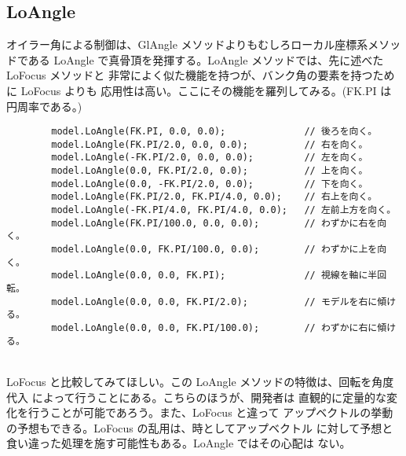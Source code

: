 \subsection{LoAngle}
オイラー角による制御は、GlAngle メソッドよりもむしろローカル座標系メソッドである
LoAngle で真骨頂を発揮する。LoAngle メソッドでは、先に述べた LoFocus メソッドと
非常によく似た機能を持つが、バンク角の要素を持つために LoFocus よりも
応用性は高い。ここにその機能を羅列してみる。(FK.PI は円周率である。)
\\
\begin{breakbox}
\begin{verbatim}
        model.LoAngle(FK.PI, 0.0, 0.0);              // 後ろを向く。
        model.LoAngle(FK.PI/2.0, 0.0, 0.0);          // 右を向く。
        model.LoAngle(-FK.PI/2.0, 0.0, 0.0);         // 左を向く。
        model.LoAngle(0.0, FK.PI/2.0, 0.0);          // 上を向く。
        model.LoAngle(0.0, -FK.PI/2.0, 0.0);         // 下を向く。
        model.LoAngle(FK.PI/2.0, FK.PI/4.0, 0.0);    // 右上を向く。
        model.LoAngle(-FK.PI/4.0, FK.PI/4.0, 0.0);   // 左前上方を向く。
        model.LoAngle(FK.PI/100.0, 0.0, 0.0);        // わずかに右を向く。
        model.LoAngle(0.0, FK.PI/100.0, 0.0);        // わずかに上を向く。
        model.LoAngle(0.0, 0.0, FK.PI);              // 視線を軸に半回転。
        model.LoAngle(0.0, 0.0, FK.PI/2.0);          // モデルを右に傾ける。
        model.LoAngle(0.0, 0.0, FK.PI/100.0);        // わずかに右に傾ける。
\end{verbatim}
\end{breakbox}
~ \\
LoFocus と比較してみてほしい。この LoAngle メソッドの特徴は、回転を角度代入
によって行うことにある。こちらのほうが、開発者は
直観的に定量的な変化を行うことが可能であろう。また、LoFocus と違って
アップベクトルの挙動の予想もできる。LoFocus の乱用は、時としてアップベクトル
に対して予想と食い違った処理を施す可能性もある。LoAngle ではその心配は
ない。

